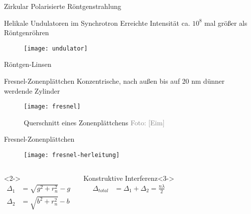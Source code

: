 \begin{frame}{Zirkular Polarisierte Röntgenstrahlung}{}
	\begin{exampleblock}{Helikale Undulatoren im Synchrotron}
		Erreichte Intensität ca. $10^8$ mal größer als Röntgenröhren
	\end{exampleblock}
	\begin{figure}[H]
		\begin{center}
			\texttt{[image: undulator]}
		\end{center}
	\end{figure}
\end{frame}

\begin{frame}{Röntgen-Linsen}{}
	\begin{block}{Fresnel-Zonenplättchen}
		Konzentrische, nach außen bis auf 20 nm dünner werdende Zylinder\\
	\end{block}
	\begin{figure}[H]
		\begin{center}
			\texttt{[image: fresnel]}
			\caption{Querschnitt eines Zonenplättchens  \tiny{\textcolor{gray}{Foto: [Eim]}}}
		\end{center}
	\end{figure}
\end{frame}

\begin{frame}{Fresnel-Zonenplättchen}{}
	\begin{figure}[H]
		\begin{center}
			\texttt{[image: fresnel-herleitung]}
		\end{center}
	\end{figure}

	\begin{columns}
			\begin{block}{}<2->
				\begin{align*}
					\Delta_1 &= \sqrt{g^2+r_n^2}-g \\
					\Delta_2 &= \sqrt{b^2+r_n^2}-b
				\end{align*}
			\end{block}
			\begin{block}{Konstruktive Interferenz}<3->
				\begin{align*}
					\Delta_{total} &= \Delta_1+\Delta_2 = \frac{n\lambda}{2}\\
				\end{align*}
			\end{block}
	\end{columns}
\end{frame}

